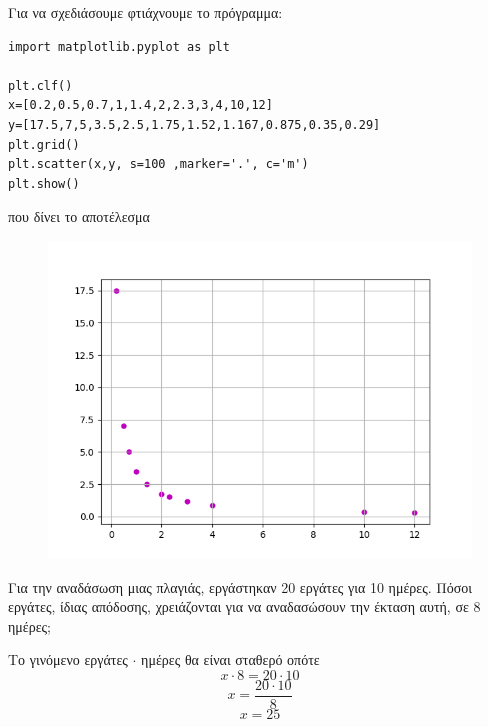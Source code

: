Για να σχεδιάσουμε φτιάχνουμε το πρόγραμμα:
\begin{lstlisting}
import matplotlib.pyplot as plt

plt.clf()
x=[0.2,0.5,0.7,1,1.4,2,2.3,3,4,10,12]
y=[17.5,7,5,3.5,2.5,1.75,1.52,1.167,0.875,0.35,0.29]
plt.grid()
plt.scatter(x,y, s=100 ,marker='.', c='m')
plt.show()
\end{lstlisting}
που δίνει το αποτέλεσμα
\begin{figure}
\includegraphics{graph9.png}
\end{figure}
\begin{exercise}
Για την αναδάσωση μιας πλαγιάς, εργάστηκαν 20 εργάτες για 10 ημέρες. Πόσοι εργάτες, ίδιας απόδοσης, χρειάζονται για να αναδασώσουν την έκταση αυτή, σε 8 ημέρες; 
\end{exercise}
Το γινόμενο εργάτες $\cdot$ ημέρες θα είναι σταθερό οπότε 
$$x\cdot 8 = 20\cdot 10$$
$$x = \frac{20\cdot 10}{8}$$
$$x =  25$$

